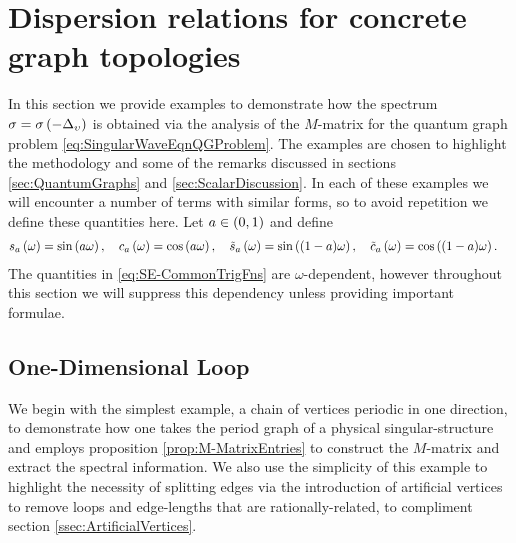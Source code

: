 \section{Dispersion relations for concrete graph topologies} \label{sec:ScalarExamples}
In this section we provide examples to demonstrate how the spectrum $\sigma=\sigma\left( -\Delta_{\upsilon} \right)$ is obtained via the analysis of the $M$-matrix for the quantum graph problem \eqref{eq:SingularWaveEqnQGProblem}.
The examples are chosen to highlight the methodology and some of the remarks discussed in sections \ref{sec:QuantumGraphs} and \ref{sec:ScalarDiscussion}.
In each of these examples we will encounter a number of terms with similar forms, so to avoid repetition we define these quantities here.
Let $a\in\left( 0,1 \right)$ and define
\begin{align} \label{eq:SE-CommonTrigFns}
	s_a\left( \omega \right) &= \sin\left( a\omega \right), \quad 
	c_a\left( \omega \right) = \cos\left( a\omega \right), \quad
	\tilde{s}_a\left( \omega \right) = \sin\left( (1-a)\omega \right), \quad 
	\tilde{c}_a\left( \omega \right) = \cos\left( (1-a)\omega \right).
\end{align}
The quantities in \eqref{eq:SE-CommonTrigFns} are $\omega$-dependent, however throughout this section we will suppress this dependency unless providing important formulae. 

\subsection{One-Dimensional Loop} \label{ssec:Example1DLoop}
We begin with the simplest example, a chain of vertices periodic in one direction, to demonstrate how one takes the period graph of a physical singular-structure and employs proposition \ref{prop:M-MatrixEntries} to construct the $M$-matrix and extract the spectral information.
We also use the simplicity of this example to highlight the necessity of splitting edges via the introduction of artificial vertices to remove loops and edge-lengths that are rationally-related, to compliment section \ref{ssec:ArtificialVertices}.

